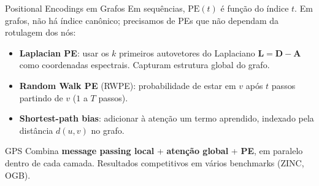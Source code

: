\documentclass[aspectratio=169,xcolor=dvipsnames]{beamer}
\begin{document}
  \begin{frame}{Positional Encodings em Grafos}
    Em sequências, $\mathrm{PE}(t)$ é função do índice $t$. Em grafos, não há
    índice canônico; precisamos de PEs que não dependam da rotulagem dos nós:

    \vspace{0.4em}
    \begin{itemize}
      \item \textbf{Laplacian PE}: usar os $k$ primeiros autovetores do
            Laplaciano $\mathbf{L} = \mathbf{D} - \mathbf{A}$ como coordenadas espectrais. Capturam
            estrutura global do grafo.
      \item \textbf{Random Walk PE} (RWPE): probabilidade de estar em $v$ após
            $t$ passos partindo de $v$ ($1$ a $T$ passos).
      \item \textbf{Shortest-path bias}: adicionar à atenção um termo
            aprendido, indexado pela distância $d(u,v)$ no grafo.
    \end{itemize}

    \vspace{0.4em}
    \begin{block}{GPS }
      Combina \textbf{message passing local} + \textbf{atenção global} + \textbf{PE},
      em paralelo dentro de cada camada. Resultados competitivos em vários benchmarks (ZINC, OGB).
    \end{block}
  \end{frame}
\end{document}
